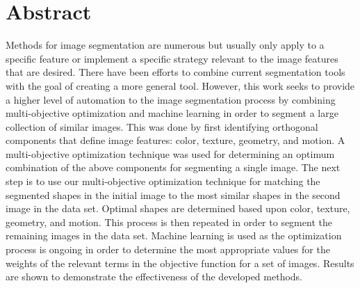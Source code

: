 \section{Abstract}
Methods for image segmentation are numerous but usually only apply to a specific feature or implement a specific strategy relevant to the image features that are desired. There have been efforts to combine current segmentation tools with the goal of creating a more general tool. However, this work seeks to provide a higher level of automation to the image segmentation process by combining multi-objective optimization and machine learning in order to segment a large collection of similar images. This was done by first identifying orthogonal components that define image features: color, texture, geometry, and motion. A multi-objective optimization technique was used for determining an optimum combination of the above components for segmenting a single image. The next step is to use our multi-objective optimization technique for matching the segmented shapes in the initial image to the most similar shapes in the second image in the data set. Optimal shapes are determined based upon color, texture, geometry, and motion. This process is then repeated in order to segment the remaining images in the data set. Machine learning is used as the optimization process is ongoing in order to determine the most appropriate values for the weights of the relevant terms in the objective function for a set of images. Results are shown to demonstrate the effectiveness of the developed methods.
